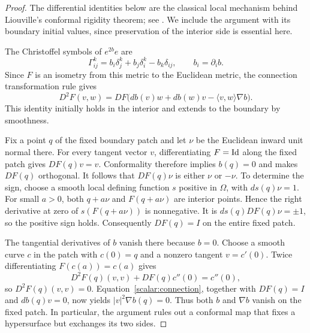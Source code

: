 \begin{proof}
The differential identities below are the classical local mechanism
behind Liouville's conformal rigidity theorem; see
\citet[Equations~(4)--(6)]{KushelmanMcGrath2024}.  We include the
argument with its boundary initial values, since preservation of the
interior side is essential here.

The Christoffel symbols of $e^{2b}e$ are
\[
 \Gamma^k_{ij}=b_i\delta^k_j+b_j\delta^k_i-b_k\delta_{ij},
 \qquad b_i=\partial_i b.
\]
Since $F$ is an isometry from this metric to the Euclidean metric,
the connection transformation rule gives
\begin{equation}\label{scalar:connection}
 D^2F(v,w)
 =DF\bigl(db(v)w+db(w)v-\langle v,w\rangle\nabla b\bigr).
\end{equation}
This identity initially holds in the interior and extends to the
boundary by smoothness.

Fix a point $q$ of the fixed boundary patch and let $\nu$ be the
Euclidean inward unit normal there.  For every tangent vector $v$,
differentiating $F=\mathrm{Id}$ along the fixed patch gives
$DF(q)v=v$.  Conformality therefore implies $b(q)=0$ and makes
$DF(q)$ orthogonal.  It follows that $DF(q)\nu$ is either $\nu$ or
$-\nu$.  To determine the sign, choose a smooth local defining
function $s$ positive in $\Omega$, with $ds(q)\nu=1$.  For small
$a>0$, both $q+a\nu$ and $F(q+a\nu)$ are interior points.  Hence
the right derivative at zero of $s(F(q+a\nu))$ is nonnegative.
It is $ds(q)DF(q)\nu=\pm1$, so the positive sign holds.
Consequently $DF(q)=I$ on the entire fixed patch.

The tangential derivatives of $b$ vanish there because $b=0$.
Choose a smooth curve $c$ in the patch with $c(0)=q$ and a nonzero
tangent $v=c'(0)$.  Twice differentiating $F(c(a))=c(a)$ gives
\[
 D^2F(q)(v,v)+DF(q)c''(0)=c''(0),
\]
so $D^2F(q)(v,v)=0$.  Equation~\eqref{scalar:connection}, together
with $DF(q)=I$ and $db(q)v=0$, now yields
$|v|^2\nabla b(q)=0$.  Thus both $b$ and $\nabla b$ vanish on the
fixed patch.  In particular, the argument rules out a conformal map
that fixes a hypersurface but exchanges its two sides.


\end{proof}
